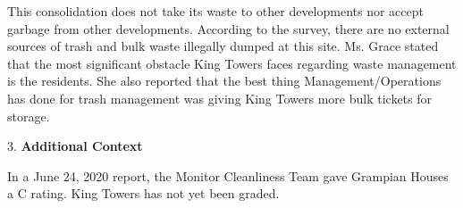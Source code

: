 This consolidation does not take its waste to other developments nor accept garbage from other developments. According to the survey, there are no external sources of trash and bulk waste illegally dumped at this site.  Ms. Grace stated that the most significant obstacle King Towers faces regarding waste management is the residents. She also reported that the best thing Management/Operations has done for trash management was giving King Towers more bulk tickets for storage.

3. \textbf{Additional Context}  

In a June 24, 2020 report, the Monitor Cleanliness Team gave Grampian Houses a C rating. King Towers has not yet been graded.